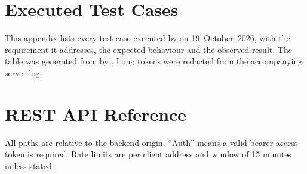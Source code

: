 
\chapter{Executed Test Cases}
\label{app:tests}

This appendix lists every test case executed by  on 19~October~2026, with the requirement it addresses, the expected behaviour and the observed result. The table was generated from  by . Long tokens were redacted from the accompanying server log.



\chapter{REST API Reference}
\label{app:api}

All paths are relative to the backend origin. ``Auth'' means a valid bearer access token is required. Rate limits are per client address and window of 15 minutes unless stated.

